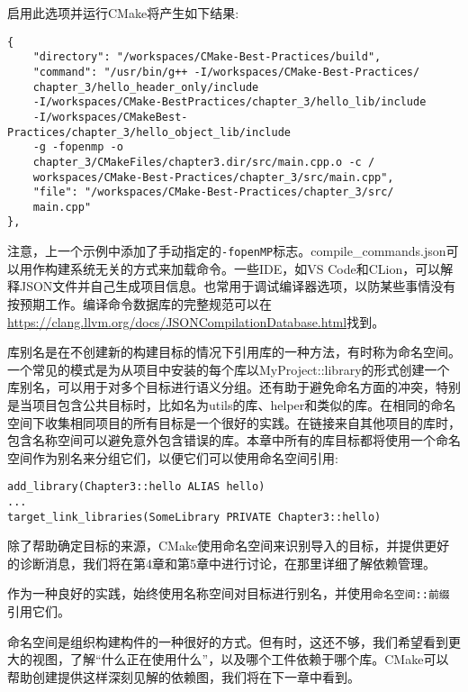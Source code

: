 启用此选项并运行CMake将产生如下结果:

\begin{lstlisting}[style=styleCMake]
{
	"directory": "/workspaces/CMake-Best-Practices/build",
	"command": "/usr/bin/g++ -I/workspaces/CMake-Best-Practices/
	chapter_3/hello_header_only/include
    -I/workspaces/CMake-BestPractices/chapter_3/hello_lib/include
    -I/workspaces/CMakeBest-Practices/chapter_3/hello_object_lib/include
    -g -fopenmp -o
	chapter_3/CMakeFiles/chapter3.dir/src/main.cpp.o -c /
	workspaces/CMake-Best-Practices/chapter_3/src/main.cpp",
	"file": "/workspaces/CMake-Best-Practices/chapter_3/src/
	main.cpp"
},
\end{lstlisting}

注意，上一个示例中添加了手动指定的\texttt{-fopenMP}标志。compile\_commands.json可以用作构建系统无关的方式来加载命令。一些IDE，如VS Code和CLion，可以解释JSON文件并自己生成项目信息。也常用于调试编译器选项，以防某些事情没有按预期工作。编译命令数据库的完整规范可以在\url{https://clang.llvm.org/docs/JSONCompilationDatabase.html}找到。


库别名是在不创建新的构建目标的情况下引用库的一种方法，有时称为命名空间。一个常见的模式是为从项目中安装的每个库以MyProject::library的形式创建一个库别名，可以用于对多个目标进行语义分组。还有助于避免命名方面的冲突，特别是当项目包含公共目标时，比如名为utils的库、helper和类似的库。在相同的命名空间下收集相同项目的所有目标是一个很好的实践。在链接来自其他项目的库时，包含名称空间可以避免意外包含错误的库。本章中所有的库目标都将使用一个命名空间作为别名来分组它们，以便它们可以使用命名空间引用:

\begin{lstlisting}[style=styleCMake]
add_library(Chapter3::hello ALIAS hello)
...
target_link_libraries(SomeLibrary PRIVATE Chapter3::hello)
\end{lstlisting}

除了帮助确定目标的来源，CMake使用命名空间来识别导入的目标，并提供更好的诊断消息，我们将在第4章和第5章中进行讨论，在那里详细了解依赖管理。

\begin{tcolorbox}[colback=blue!5!white,colframe=blue!75!black,title=总是使用命名空间]
作为一种良好的实践，始终使用名称空间对目标进行别名，并使用\texttt{命名空间::前缀}引用它们。
\end{tcolorbox}

命名空间是组织构建构件的一种很好的方式。但有时，这还不够，我们希望看到更大的视图，了解“什么正在使用什么”，以及哪个工件依赖于哪个库。CMake可以帮助创建提供这样深刻见解的依赖图，我们将在下一章中看到。















